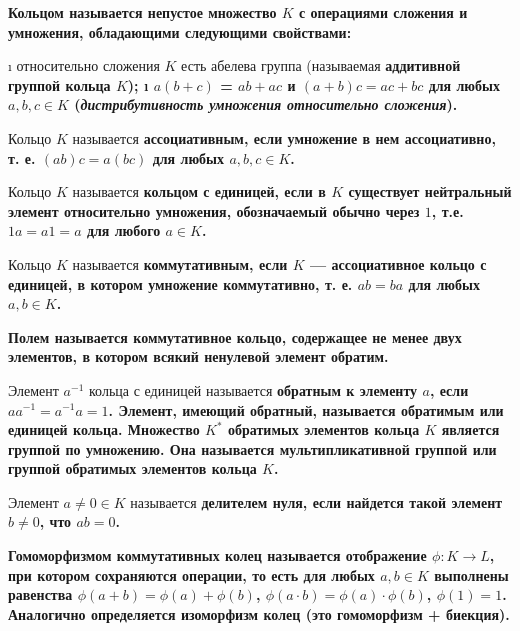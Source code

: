 

\date{}



\begin{defn}
\bf{Кольцом} называется непустое множество \(K\) с операциями сложения и умножения, обладающими следующими свойствами:

\begin{itemize}
\tightlist
\i
  относительно сложения \(K\) есть абелева группа (называемая \bf{аддитивной группой} кольца \(K\));
\i
  \(a(b+c)\) = \(ab+ac\) и \((a+b)c = ac+bc\) для любых \(a,b,c \in K\) (\emph{дистрибутивность умножения относительно сложения}).
\end{itemize}

Кольцо \(K\) называется \bf{ассоциативным}, если умножение в нем ассоциативно, т. е. \((ab)c = a(bc)\) для любых \(a, b, c \in K\).

Кольцо \(K\) называется \bf{кольцом с единицей}, если в \(K\) существует нейтральный элемент относительно умножения, обозначаемый обычно через \(1\), т.е. \(1a=a1=a\) для любого \(a\in K\).

Кольцо \(K\) называется \bf{коммутативным}, если \(K\) --- ассоциативное кольцо с единицей, в котором умножение коммутативно, т. е. \(ab = ba\) для любых \(a, b \in K\).

\bf{Полем} называется коммутативное кольцо, содержащее не менее двух элементов, в котором всякий ненулевой элемент обратим.
\end{defn}

\begin{defn}
Элемент \(a^{-1}\) кольца с единицей называется \bf{обратным} к элементу \(a\), если \(aa^{-1} = a^{-1}a = 1\). Элемент, имеющий обратный, называется \bf{обратимым} или \bf{единицей кольца}. Множество \(K^*\) обратимых элементов кольца \(K\) является группой по умножению. Она называется \bf{мультипликативной группой} или \bf{группой обратимых элементов} кольца \(K\).
\end{defn}

\begin{defn}
Элемент \(a\neq 0\in K\) называется \bf{делителем нуля}, если найдется такой элемент \(b \neq 0\), что \(ab=0\).
\end{defn}

\begin{defn}
\bf{Гомоморфизмом} коммутативных колец называется отображение \(\phi: K \to L\), при котором сохраняются операции, то есть для любых \(a,b \in K\) выполнены равенства \(\phi(a+b)=\phi(a)+\phi(b)\), \(\phi(a\cdot b)=\phi(a)\cdot \phi(b)\), \(\phi(1)=1\). Аналогично определяется \bf{изоморфизм} колец (это гомоморфизм + биекция).
\end{defn}

